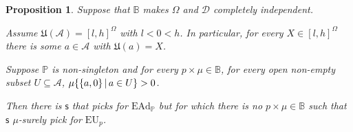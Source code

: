 \documentclass[a4paper]{article}
\newtheorem{proposition}[theorem]{Proposition}
\newcommand\A{\mathcal{A}}
\renewcommand\P{\mathbb{P}} %
\newcommand\EU{\mathrm{EU}}
\newcommand\EAd{\mathrm{EAd}}
\newcommand\U{\mathfrak{U}} %
\newcommand{\Decs}{\mathcal{D}}
\newcommand\s{\mathsf{s}}
\newcommand{\IB}{\mathbb{B}}
\newcommand{\IP}{\P}
\newcommand\SetDelimiter[1][]{
	\nonscript\,#1\vert \allowbreak \nonscript\,\mathopen{}}
\providecommand\given{\SetDelimiter}
\newenvironment{CCM rewritten}
{\begingroup\color{blue}} %
{\endgroup}              %
\begin{document}
\begin{proposition}\label{thm:ead-existsimpermissible[dep]:spreadegtakeorleave}%
	Suppose that $\IB$ makes $\Omega$ and $\Decs$ completely independent. 
	
	Assume $\U(\A)=[l,h]^\Omega$ with $l<0<h$. In particular, for every $X\in [l,h]^\Omega$ there is some $a\in \A$ with $\U(a)=X$. 


	Suppose $\IP$ is non-singleton and for every $p \times \mu\in\IB$, for every open non-empty subset $U \subseteq\A$, $\mu\{\{a,0\}\given a\in U\}>0$.

Then there is $\s$ that picks for $\EAd_\IP$ but for which there is no $p\times\mu\in \IB$ such that $\s$ $\mu$-surely pick for $\EU_p$.
\end{proposition}
\end{document}
